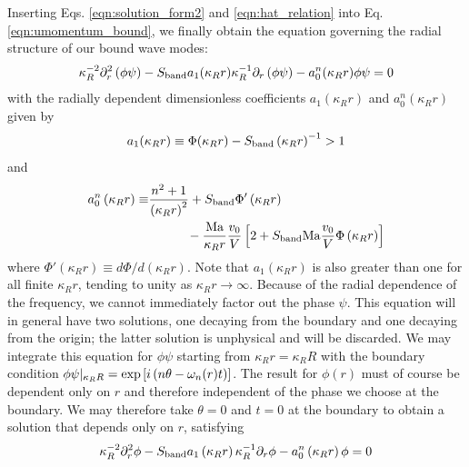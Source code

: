 \documentclass[%
 reprint,
superscriptaddress,
longbibliography,
 amsmath,amssymb,
 prl,
 citeautoscript,
]{revtex4-1}
\begin{document}
Inserting Eqs. \ref{eqn:solution_form2} and \ref{eqn:hat_relation} into Eq. \ref{eqn:umomentum_bound}, we finally obtain the equation governing the radial structure of our bound wave modes:
\begin{equation}
\kappa_R^{-2} \partial_r^2 \left( \phi \psi \right) - S_{\rm band} a_1(\kappa_R r) \kappa_R^{-1} \partial_r \left( \phi \psi \right) - a_0^n(\kappa_R r) \phi \psi = 0
\label{eqn:radial_structure}
\end{equation}
with the radially dependent dimensionless coefficients $a_1(\kappa_R r)$ and $a_0^n(\kappa_R r)$ given by
\begin{equation}
a_1(\kappa_R r) \equiv \Phi(\kappa_R r) - S_{\rm band} \left( \kappa_R r \right)^{-1} > 1
\label{eqn:b_defn}
\end{equation}
and
\begin{equation}
\begin{split}
a_0^n \left( \kappa_R r \right) \equiv &\frac{n^2 + 1}{\left( \kappa_R r \right)^2} + S_{\rm band} \Phi' \left( \kappa_R r \right) \\
&\quad \quad \quad- \frac{{\rm Ma}}{\kappa_R r} \frac{v_0}{V} \left[ 2 + S_{\rm band} {\rm Ma} \frac{v_0}{V} \Phi \left( \kappa_R r \right) \right]
\end{split}
\label{eqn:c_defn}
\end{equation}
where $\Phi'\left( \kappa_R r \right) \equiv d\Phi/d\left(\kappa_R r \right)$. Note that $a_1 \left( \kappa_R r \right)$ is also greater than one for all finite $\kappa_R r$, tending to unity as $\kappa_R r \rightarrow \infty$. Because of the radial dependence of the frequency, we cannot immediately factor out the phase $\psi$. This equation will in general have two solutions, one decaying from the boundary and one decaying from the origin; the latter solution is unphysical and will be discarded. We may integrate this equation for $\phi \psi$ starting from $\kappa_R r = \kappa_R R$ with the boundary condition $\phi \psi |_{\kappa_R R} = {\rm exp} \left[ i \left( n \theta - \omega_n (r) t \right) \right]$. The result for $\phi(r)$ must of course be dependent only on $r$ and therefore independent of the phase we choose at the boundary. We may therefore take $\theta = 0$ and $t = 0$ at the boundary to obtain a solution that depends only on $r$, satisfying
\begin{equation}
\kappa_R^{-2} \partial_r^2 \phi - S_{\rm band} a_1\left( \kappa_R r \right) \kappa_R^{-1} \partial_r \phi - a_0^n\left( \kappa_R r \right) \phi = 0
\label{eqn:radial_structure_nophase}
\end{equation}
\end{document}
